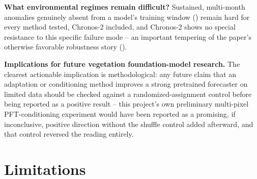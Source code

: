 \documentclass[11pt]{article}
\begin{document}
\textbf{What environmental regimes remain difficult?} Sustained, multi-month anomalies genuinely
absent from a model's training window () remain hard for every method
tested, Chronos-2 included, and Chronos-2 shows no special resistance to this specific failure
mode -- an important tempering of the paper's otherwise favorable robustness story
().

\textbf{Implications for future vegetation foundation-model research.} The clearest actionable
implication is methodological: any future claim that an adaptation or conditioning method improves
a strong pretrained forecaster on limited data should be checked against a randomized-assignment
control before being reported as a positive result -- this project's own preliminary multi-pixel
PFT-conditioning experiment would have been reported as a promising, if inconclusive, positive
direction without the shuffle control added afterward, and that control reversed the reading
entirely.

\section{Limitations}
\label{sec:limitations}
\end{document}
